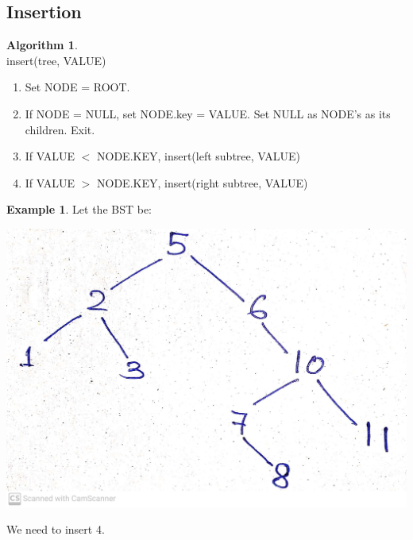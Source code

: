 \documentclass[10pt, a4paper]{extarticle}
\theoremstyle{definition}
\newtheorem{alg}{Algorithm}
\newtheorem{eg}{Example}
\begin{document}
\subsection{Insertion}
\begin{alg}\hfill\\
	insert(tree, VALUE)
	\begin{enumerate}
		\item Set NODE = ROOT.
		\item If NODE = NULL, set NODE.key = VALUE. Set NULL as NODE's as its children. Exit.
		\item If VALUE $<$ NODE.KEY, insert(left subtree, VALUE)
		\item If VALUE $>$ NODE.KEY, insert(right subtree, VALUE)
	\end{enumerate}
\end{alg}
\begin{eg}
	Let the BST be:
	\begin{center}
		\includegraphics[scale=0.07]{bst1.jpg}\\
	\end{center}
	We need to insert 4.
	\begin{center}

\end{center}
\end{eg}
\end{document}
